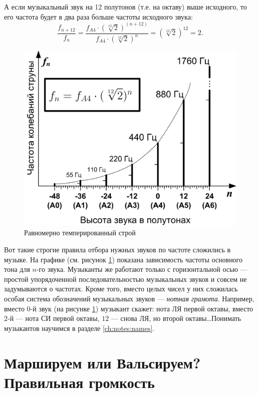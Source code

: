 А если музыкальный звук на 12 полутонов (т.е. на октаву) выше исходного, то его частота будет в два раза больше частоты исходного звука:
\[
    \frac{f_{n+12}}{f_n} = \frac{f_{A4}\cdot(\sqrt[12]{2})^{(n+12)}}{f_{A4}\cdot(\sqrt[12]{2})^n} = (\sqrt[12]{2})^{12} = 2.
\]

\begin{figure}[!ht]
    \centering
    \includegraphics{fig/tempered} 
    \caption{Равномерно темперированный строй}\label{fig:music:tone:tempered}
\end{figure} 

Вот такие строгие правила отбора нужных звуков по частоте сложились в музыке. На графике (см. рисунок \ref{fig:music:tone:tempered}) показана зависимость частоты основного тона для $n$-го звука. Музыканты же работают только с горизонтальной осью --- простой упорядоченной последовательностью музыкальных звуков и совсем не задумываются о частотах. Кроме того, вместо целых чисел у них сложилась особая система обозначений музыкальных звуков --- \emph{нотная грамота}. Например, вместо $0$-й звук (на рисунке \ref{fig:music:tone:tempered}) музыкант скажет: нота ЛЯ первой октавы, вместо $2$-й --- нота СИ первой октавы, $12$ --- снова ЛЯ, но второй октавы\ldots Понимать музыкантов научимся в разделе \ref{ch:notes:names}.


\section{Маршируем или Вальсируем? Правильная громкость}
\label{ch:music:volume}

